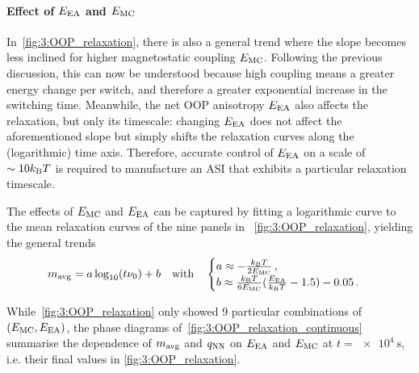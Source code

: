 \paragraph{Effect of $E_\mathrm{EA}$ and $E_\mathrm{MC}$}
In~\cref{fig:3:OOP_relaxation}, there is also a general trend where the slope becomes less inclined for higher magnetostatic coupling $E_\mathrm{MC}$.
Following the previous discussion, this can now be understood because high coupling means a greater energy change per switch, and therefore a greater exponential increase in the switching time.
Meanwhile, the net OOP anisotropy $E_\mathrm{EA}$ also affects the relaxation, but only its timescale: changing $E_\mathrm{EA}$ does not affect the aforementioned slope but simply shifts the relaxation curves along the (logarithmic) time axis.
Therefore, accurate control of $E_\mathrm{EA}$ on a scale of $\sim 10\kBT$ is required to manufacture an ASI that exhibits a particular relaxation timescale. \par
The effects of $E_\mathrm{MC}$ and $E_\mathrm{EA}$ can be captured by fitting a logarithmic curve to the mean relaxation curves of the nine panels in ~\cref{fig:3:OOP_relaxation}, yielding the general trends
\begin{equation}
	\mavg = a \log_{10}(t \nu_0) + b \quad \mathrm{with} \quad \begin{cases}
		a \approx -\frac{\kBT}{2\EMC} \, \mathrm{,} \\
		b \approx \frac{\kBT}{6\EMC}(\frac{\EEA}{\kBT} - 1.5) - 0.05 \, \mathrm{.}
	\end{cases}
\end{equation} %

While~\cref{fig:3:OOP_relaxation} only showed 9 particular combinations of $(E_\mathrm{MC},E_\mathrm{EA})$, the phase diagrams of~\cref{fig:3:OOP_relaxation_continuous} summarise the dependence of $m_\mathrm{avg}$ and $q_\mathrm{NN}$ on $E_\mathrm{EA}$ and $E_\mathrm{MC}$  at $t = \SI{e4}{\second}$, i.e. their final values in \cref{fig:3:OOP_relaxation}.


